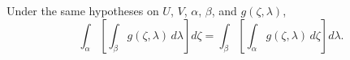 Under the same hypotheses on $U$, $V$, $\alpha$, $\beta$, and $g(\zeta, \lambda)$,
$$\int_{\alpha} \left[ \int_{\beta} g(\zeta, \lambda) \, d\lambda \right] d\zeta = \int_{\beta} \left[ \int_{\alpha} g(\zeta, \lambda) \, d\zeta \right] d\lambda.$$
